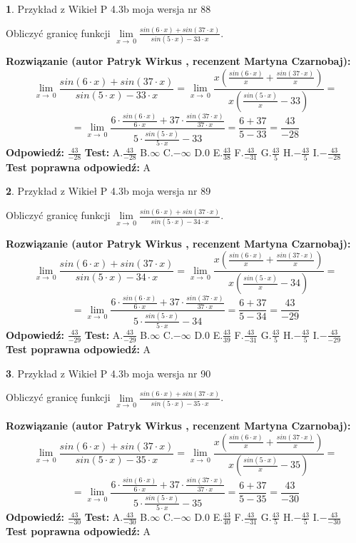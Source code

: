 \documentclass[12pt, a4paper]{article}
\theoremstyle{definition} %
\newtheorem{zad}{}
\newcommand{\zadStart}[1]{\begin{zad}#1\newline}
\newcommand{\zadStop}{\end{zad}}
\newcommand{\rozwStart}[2]{\noindent \textbf{Rozwiązanie (autor #1 , recenzent #2): }\newline}
\newcommand{\rozwStop}{\newline}
\newcommand{\odpStart}{\noindent \textbf{Odpowiedź:}\newline}
\newcommand{\odpStop}{\newline}
\newcommand{\testStart}{\noindent \textbf{Test:}\newline}
\newcommand{\testStop}{\newline}
\newcommand{\kluczStart}{\noindent \textbf{Test poprawna odpowiedź:}\newline}
\newcommand{\kluczStop}{\newline}
\begin{document}
\zadStart{Przykład z Wikieł P 4.3b moja wersja nr 88}


Obliczyć granicę funkcji $\lim\limits_{x\to\ 0}\frac{sin(6 \cdot x)+sin(37 \cdot x)}{sin(5 \cdot x)-33 \cdot x}$.
\zadStop
\rozwStart{Patryk Wirkus}{Martyna Czarnobaj}
$$\lim\limits_{x\to\ 0}\frac{sin(6 \cdot x)+sin(37 \cdot x)}{sin(5 \cdot x)-33 \cdot x}=\lim\limits_{x\to\ 0}\frac{x(\frac{sin(6 \cdot x)}{x}+\frac{sin(37 \cdot x)}{x})}{x(\frac{sin(5 \cdot x)}{x}-33)}=$$
$$=\lim\limits_{x\to\ 0}\frac{6 \cdot \frac{sin(6 \cdot x)}{6 \cdot x}+37 \cdot \frac{sin(37 \cdot x)}{37 \cdot x}}{5 \cdot \frac{sin(5 \cdot x)}{5 \cdot x}-33}=\frac{6+37}{5-33} = \frac{43}{-28}$$
\rozwStop
\odpStart
$\frac{43}{-28}$
\odpStop
\testStart
A.$\frac{43}{-28}$
B.$\infty$
C.$-\infty$
D.$0$
E.$\frac{43}{38}$
F.$\frac{43}{-31}$
G.$\frac{43}{5}$
H.$-\frac{43}{5}$
I.$-\frac{43}{-28}$
\testStop
\kluczStart
A
\kluczStop



\zadStart{Przykład z Wikieł P 4.3b moja wersja nr 89}


Obliczyć granicę funkcji $\lim\limits_{x\to\ 0}\frac{sin(6 \cdot x)+sin(37 \cdot x)}{sin(5 \cdot x)-34 \cdot x}$.
\zadStop
\rozwStart{Patryk Wirkus}{Martyna Czarnobaj}
$$\lim\limits_{x\to\ 0}\frac{sin(6 \cdot x)+sin(37 \cdot x)}{sin(5 \cdot x)-34 \cdot x}=\lim\limits_{x\to\ 0}\frac{x(\frac{sin(6 \cdot x)}{x}+\frac{sin(37 \cdot x)}{x})}{x(\frac{sin(5 \cdot x)}{x}-34)}=$$
$$=\lim\limits_{x\to\ 0}\frac{6 \cdot \frac{sin(6 \cdot x)}{6 \cdot x}+37 \cdot \frac{sin(37 \cdot x)}{37 \cdot x}}{5 \cdot \frac{sin(5 \cdot x)}{5 \cdot x}-34}=\frac{6+37}{5-34} = \frac{43}{-29}$$
\rozwStop
\odpStart
$\frac{43}{-29}$
\odpStop
\testStart
A.$\frac{43}{-29}$
B.$\infty$
C.$-\infty$
D.$0$
E.$\frac{43}{39}$
F.$\frac{43}{-31}$
G.$\frac{43}{5}$
H.$-\frac{43}{5}$
I.$-\frac{43}{-29}$
\testStop
\kluczStart
A
\kluczStop



\zadStart{Przykład z Wikieł P 4.3b moja wersja nr 90}


Obliczyć granicę funkcji $\lim\limits_{x\to\ 0}\frac{sin(6 \cdot x)+sin(37 \cdot x)}{sin(5 \cdot x)-35 \cdot x}$.
\zadStop
\rozwStart{Patryk Wirkus}{Martyna Czarnobaj}
$$\lim\limits_{x\to\ 0}\frac{sin(6 \cdot x)+sin(37 \cdot x)}{sin(5 \cdot x)-35 \cdot x}=\lim\limits_{x\to\ 0}\frac{x(\frac{sin(6 \cdot x)}{x}+\frac{sin(37 \cdot x)}{x})}{x(\frac{sin(5 \cdot x)}{x}-35)}=$$
$$=\lim\limits_{x\to\ 0}\frac{6 \cdot \frac{sin(6 \cdot x)}{6 \cdot x}+37 \cdot \frac{sin(37 \cdot x)}{37 \cdot x}}{5 \cdot \frac{sin(5 \cdot x)}{5 \cdot x}-35}=\frac{6+37}{5-35} = \frac{43}{-30}$$
\rozwStop
\odpStart
$\frac{43}{-30}$
\odpStop
\testStart
A.$\frac{43}{-30}$
B.$\infty$
C.$-\infty$
D.$0$
E.$\frac{43}{40}$
F.$\frac{43}{-31}$
G.$\frac{43}{5}$
H.$-\frac{43}{5}$
I.$-\frac{43}{-30}$
\testStop
\kluczStart
A
\kluczStop
\end{document}
